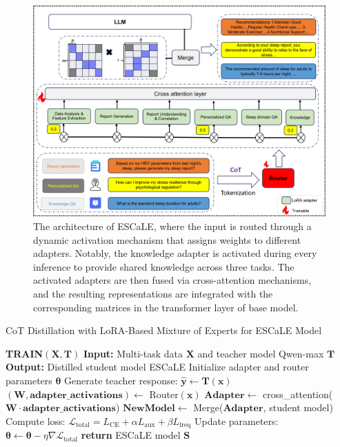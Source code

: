 \documentclass[preprint,12pt]{elsarticle}
\begin{document}
\begin{figure}[t]
\centering
\includegraphics[width=\textwidth]{MoELORA5.png}
\caption{The architecture of ESCaLE, where the input is routed through a dynamic activation mechanism that assigns weights to different adapters. Notably, the knowledge adapter is activated during every inference to provide shared knowledge across three tasks. The activated adapters are then fused via cross-attention mechanisms, and the resulting representations are integrated with the corresponding matrices in the transformer layer of base model.}
\label{LoRA-MoE}
\end{figure}

\begin{algorithm}[h]
\caption{CoT Distillation with LoRA-Based Mixture of Experts for ESCaLE Model}
\label{ESCaLE_distillation}
\begin{algorithmic}[1]
\STATE \textbf{TRAIN}$(\mathbf{X}, \mathbf{T})$
\STATE \textbf{Input:} Multi-task data $\mathbf{X}$ and teacher model Qwen-max $\mathbf{T}$
\STATE \textbf{Output:} Distilled student model ESCaLE
\STATE Initialize adapter and router parameters $\mathbf{\theta}$
  \STATE Generate teacher response: $\hat{\mathbf{y}} \gets \mathbf{T}(\mathbf{x})$
  \STATE $(\mathbf{W}, \mathbf{adapter\_activations}) \gets$ Router$(\mathbf{x})$
  \STATE $\mathbf{Adapter} \gets$ cross\_attention($\mathbf{W} \cdot \mathbf{adapter\_activations}$)
  \STATE $\mathbf{NewModel} \gets$ Merge($\mathbf{Adapter}$, student model)
  \STATE Compute loss: $\mathcal{L}_{\text{total}} = L_{\text{CE}} + \alpha L_{\text{aux}} + \beta L_{\text{freq}}$
  \STATE Update parameters: $\mathbf{\theta} \gets \mathbf{\theta} - \eta \nabla \mathcal{L}_{\text{total}}$
\ENDFOR
\STATE \textbf{return} ESCaLE model $\mathbf{S}$

\end{algorithmic}
\end{algorithm}
\end{document}
